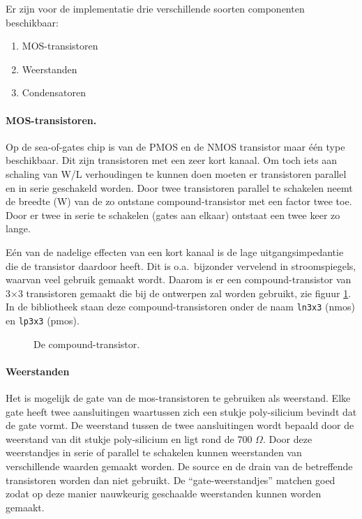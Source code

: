 Er zijn voor de implementatie drie verschillende soorten componenten beschikbaar:
\begin{enumerate}
\item
MOS-transistoren
\item
Weerstanden
\item
Condensatoren
\end{enumerate}
\paragraph{MOS-transistoren.}
Op de sea-of-gates chip is van de PMOS en de NMOS transistor maar \'e\'en type beschikbaar.
Dit zijn transistoren met een zeer kort kanaal.
Om toch iets aan schaling van W/L verhoudingen te kunnen doen moeten er transistoren parallel en in serie geschakeld worden.
Door twee transistoren parallel te schakelen neemt de breedte (W) van de zo ontstane compound-transistor met een factor twee toe.
Door er twee in serie te schakelen (gates aan elkaar) ontstaat een twee keer zo lange.

E\'en van de nadelige effecten van een kort kanaal is de lage uitgangsimpedantie die de transistor daardoor heeft.
Dit is o.a.\ bijzonder vervelend in stroomspiegels, waarvan veel gebruik gemaakt wordt.
Daarom is er een compound-transistor van 3$\times$3 transistoren gemaakt die bij de ontwerpen zal worden gebruikt,
zie figuur \ref{COMPOUND_TOR}.
In de bibliotheek staan deze compound-transistoren
onder de naam {\tt ln3x3} (nmos) en {\tt lp3x3} (pmos).


\begin{figure}[htb]
\centerline{}
\caption{De compound-transistor.}
\label{COMPOUND_TOR}
\end{figure}
\paragraph{Weerstanden}
Het is mogelijk de gate van de mos-transistoren te gebruiken als weerstand.
Elke gate heeft twee aansluitingen waartussen zich een stukje poly-silicium bevindt dat de gate vormt.
De weerstand tussen de twee aansluitingen wordt bepaald door de weerstand van dit stukje poly-silicium en ligt rond de 700 $\Omega$. 
Door deze weerstandjes in serie of parallel te schakelen kunnen weerstanden van verschillende waarden gemaakt worden.
De source en de drain van de betreffende transistoren worden dan niet gebruikt.
De ``gate-weerstandjes'' matchen goed zodat op deze manier nauwkeurig geschaalde weerstanden kunnen worden gemaakt.
